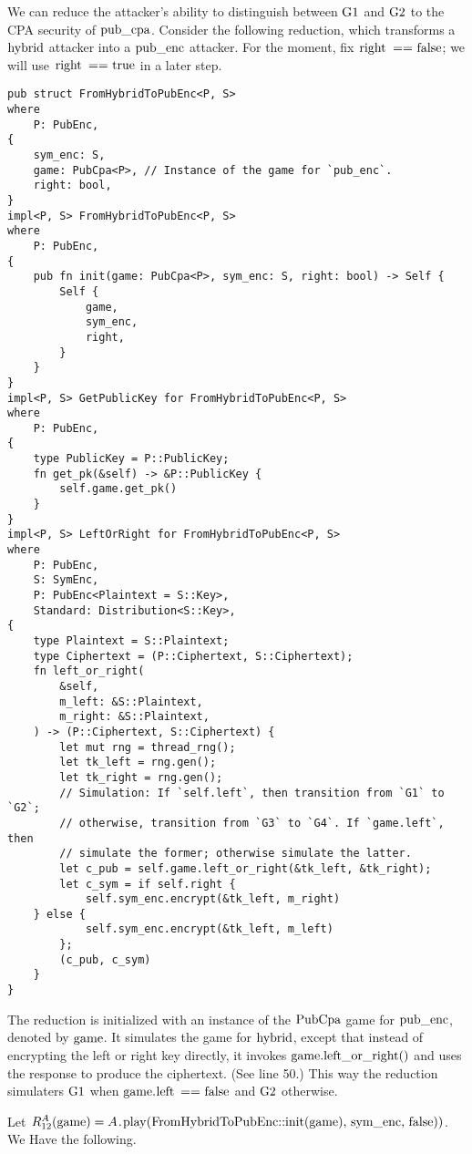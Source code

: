 We can reduce the attacker's ability to distinguish between $\code{G1}$ and
$\code{G2}$ to the CPA security of $\code{pub_cpa}$.
%
Consider the following reduction, which transforms a $\code{hybrid}$ attacker
into a $\code{pub_enc}$ attacker. For the moment, fix $\code{right == false}$;
we will use $\code{right == true}$ in a later step.
%
\begin{lstlisting}
pub struct FromHybridToPubEnc<P, S>
where
    P: PubEnc,
{
    sym_enc: S,
    game: PubCpa<P>, // Instance of the game for `pub_enc`.
    right: bool,
}
impl<P, S> FromHybridToPubEnc<P, S>
where
    P: PubEnc,
{
    pub fn init(game: PubCpa<P>, sym_enc: S, right: bool) -> Self {
        Self {
            game,
            sym_enc,
            right,
        }
    }
}
impl<P, S> GetPublicKey for FromHybridToPubEnc<P, S>
where
    P: PubEnc,
{
    type PublicKey = P::PublicKey;
    fn get_pk(&self) -> &P::PublicKey {
        self.game.get_pk()
    }
}
impl<P, S> LeftOrRight for FromHybridToPubEnc<P, S>
where
    P: PubEnc,
    S: SymEnc,
    P: PubEnc<Plaintext = S::Key>,
    Standard: Distribution<S::Key>,
{
    type Plaintext = S::Plaintext;
    type Ciphertext = (P::Ciphertext, S::Ciphertext);
    fn left_or_right(
        &self,
        m_left: &S::Plaintext,
        m_right: &S::Plaintext,
    ) -> (P::Ciphertext, S::Ciphertext) {
        let mut rng = thread_rng();
        let tk_left = rng.gen();
        let tk_right = rng.gen();
        // Simulation: If `self.left`, then transition from `G1` to `G2`;
        // otherwise, transition from `G3` to `G4`. If `game.left`, then
        // simulate the former; otherwise simulate the latter.
        let c_pub = self.game.left_or_right(&tk_left, &tk_right);
        let c_sym = if self.right {
            self.sym_enc.encrypt(&tk_left, m_right)
    } else {
            self.sym_enc.encrypt(&tk_left, m_left)
        };
        (c_pub, c_sym)
    }
}
\end{lstlisting}
%
The reduction is initialized with an instance of the $\code{PubCpa}$ game for
$\code{pub_enc}$, denoted by $\code{game}$. It simulates the game for
$\code{hybrid}$, except that instead of encrypting the left or right key
directly, it invokes $\code{game.left_or_right()}$ and uses the response to
produce the ciphertext. (See line 50.) This way the reduction simulaters
$\code{G1}$ when $\code{game.left == false}$ and $\code{G2}$ otherwise.

Let $R_{\code{12}}^A(\code{game}) =
A\code{.play(FromHybridToPubEnc::init(game), sym_enc, false))}$.
%
We Have the following.

